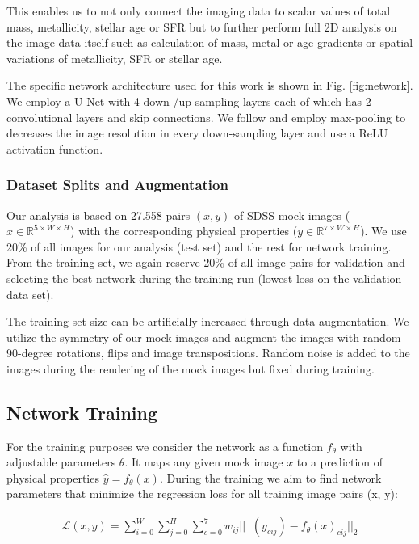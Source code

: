 \documentclass[useAMS,usenatbib]{mnras}
\begin{document}
This enables us to not only connect the imaging data to scalar values of total mass, metallicity, stellar age or SFR but to further perform full 2D analysis on the image data itself such as calculation of mass, metal or age gradients or spatial variations of metallicity, SFR or stellar age.

The specific network architecture used for this work is shown in Fig. \ref{fig:network}. We employ a U-Net with 4 down-/up-sampling layers each of which has 2 convolutional layers and skip connections. We follow \cite{Ronneberger2015} and employ max-pooling to decreases the image resolution in every down-sampling layer and use a ReLU activation function.

\subsubsection{Dataset Splits and Augmentation}

Our analysis is based on 27.558 pairs $(x, y)$ of SDSS mock images ($x \in \mathbb{R}^{5 \times W \times H}$) with the corresponding physical properties ($y \in \mathbb{R}^{7 \times W \times H}$). We use 20\% of all images for our analysis (test set) and the rest for network training. From the training set, we again reserve 20\% of all image pairs for validation and selecting the best network during the training run (lowest loss on the validation data set).

The training set size can be artificially increased through data augmentation. We utilize the symmetry of our mock images and augment the images with random 90-degree rotations, flips and image transpositions. Random noise is added to the images during the rendering of the mock images but fixed during training.

\subsection{Network Training}

For the training purposes we consider the network as a function $f_\theta$ with adjustable parameters $\theta$. It maps any given mock image $x$ to a prediction of physical properties $\hat{y} = f_\theta(x)$. During the training we aim to find network parameters that minimize the regression loss for all training image pairs (x, y):

\begin{align}
    \mathcal{L}(x,y) =  \sum_{i=0}^W \sum_{j=0}^H \sum_{c=0}^7 w_{ij} || \mathop{\log_{10}}(y_{cij}) - f_\theta(x)_{cij} ||_2
\end{align}
\end{document}
